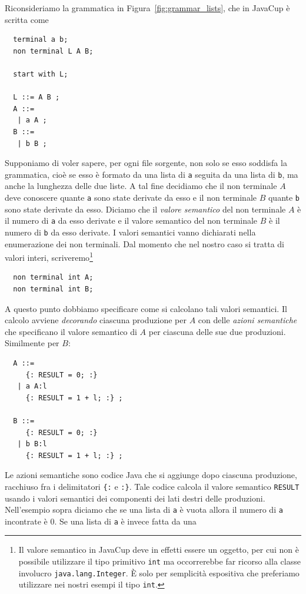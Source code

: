 Riconsideriamo la grammatica in Figura~\ref{fig:grammar_lists}, che in
JavaCup \`e scritta come
%
\begin{verbatim}
  terminal a b;
  non terminal L A B;

  start with L;

  L ::= A B ;
  A ::=
   | a A ;
  B ::=
   | b B ;
\end{verbatim}
%
Supponiamo di voler sapere, per ogni file sorgente, non solo se esso
soddisfa la grammatica, cio\`e se esso \`e formato da una lista di
\texttt{a} seguita da una lista di \texttt{b}, ma anche la lunghezza delle
due liste. A tal fine decidiamo che il non terminale $A$ deve conoscere
quante \texttt{a} sono state derivate da esso e il non terminale $B$
quante \texttt{b} sono state derivate da esso. Diciamo che il
\emph{valore semantico} del non terminale $A$ \`e il numero di \texttt{a}
da esso derivate e il valore semantico del non terminale $B$ \`e il numero
di \texttt{b} da esso derivate. I valori semantici vanno dichiarati nella
enumerazione dei non terminali. Dal momento che nel nostro caso si tratta
di valori interi, scriveremo\footnote{Il valore semantico in JavaCup deve
in effetti essere un oggetto, per cui non \`e possibile utilizzare il tipo
primitivo \texttt{int} ma occorrerebbe far ricorso alla classe involucro
\texttt{java.lang.Integer}. \`E solo per semplicit\`a espositiva che preferiamo
utilizzare nei nostri esempi il tipo \texttt{int}.}
%
\begin{verbatim}
  non terminal int A;
  non terminal int B;
\end{verbatim}
%
A questo punto dobbiamo specificare come si calcolano tali valori semantici.
Il calcolo avviene
\emph{decorando} ciascuna produzione per $A$ con delle \emph{azioni semantiche}
che specificano il valore semantico di $A$ per ciascuna delle sue due
produzioni. Similmente per $B$:
%
\begin{verbatim}
  A ::=
     {: RESULT = 0; :}
   | a A:l
     {: RESULT = 1 + l; :} ;

  B ::=
     {: RESULT = 0; :}
   | b B:l
     {: RESULT = 1 + l; :} ;
\end{verbatim}
%
Le azioni semantiche sono codice Java che si aggiunge dopo ciascuna produzione,
racchiuso fra i delimitatori \verb!{:! e \verb!:}!. Tale codice calcola
il valore semantico \texttt{RESULT} usando i valori semantici dei componenti
dei lati destri delle produzioni. Nell'esempio sopra diciamo che se una
lista di \texttt{a} \`e vuota allora il numero di \texttt{a}
incontrate \`e $0$. Se una lista di \texttt{a} \`e invece fatta da una
